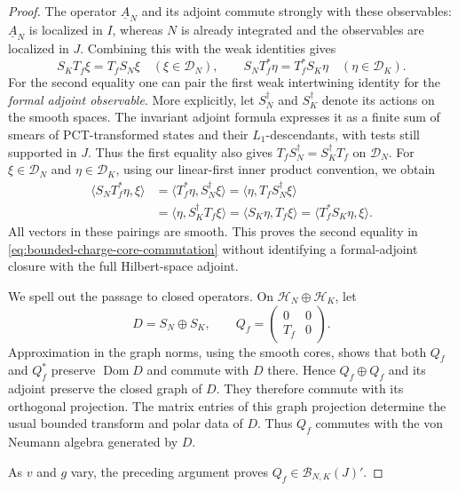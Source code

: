 \begin{proof}
The operator $\underline A_N$ and its adjoint commute strongly with these
observables: $\underline A_N$ is localized in $I$, whereas $N$ is already
integrated and the observables are localized in $J$.
Combining this with the weak identities gives
\begin{equation}
 S_KT_f\xi=T_fS_N\xi\quad(\xi\in\mathcal D_N),
 \qquad
 S_NT_f^*\eta=T_f^*S_K\eta\quad(\eta\in\mathcal D_K).
 \label{eq:bounded-charge-core-commutation}
\end{equation}
For the second equality one can pair the first weak intertwining
identity for the \emph{formal adjoint observable}.  More explicitly,
let $S_N^\dagger$ and $S_K^\dagger$ denote its actions on the smooth
spaces.  The invariant adjoint formula expresses it as a finite sum
of smears of PCT-transformed states and their $L_1$-descendants, with
tests still supported in $J$.  Thus the first equality also gives
$T_fS_N^\dagger=S_K^\dagger T_f$ on $\mathcal D_N$.
For $\xi\in\mathcal D_N$ and $\eta\in\mathcal D_K$, using our
linear-first inner product convention, we obtain
\[
\begin{aligned}
 \langle S_NT_f^*\eta,\xi\rangle
 &=\langle T_f^*\eta,S_N^\dagger\xi\rangle
  =\langle\eta,T_fS_N^\dagger\xi\rangle\\
 &=\langle\eta,S_K^\dagger T_f\xi\rangle
  =\langle S_K\eta,T_f\xi\rangle
  =\langle T_f^*S_K\eta,\xi\rangle.
\end{aligned}
\]
All vectors in these pairings are smooth.  This proves the second
equality in \eqref{eq:bounded-charge-core-commutation} without
identifying a formal-adjoint closure with the full Hilbert-space
adjoint.

We spell out the passage to closed operators.  On
$\mathcal H_N\oplus\mathcal H_K$, let
\[
 D=S_N\oplus S_K,\qquad
 Q_f=\begin{pmatrix}0&0\\T_f&0\end{pmatrix}.
\]
Approximation in the graph norms, using the smooth cores, shows that
both $Q_f$ and $Q_f^*$ preserve $\operatorname{Dom}D$ and commute with
$D$ there.  Hence $Q_f\oplus Q_f$ and its adjoint preserve the closed
graph of $D$.  They therefore commute with its orthogonal projection.
The matrix entries of this graph projection determine the usual
bounded transform and polar data of $D$.  Thus $Q_f$ commutes with the
von Neumann algebra generated by $D$.

As $v$ and $g$ vary, the preceding argument proves
$Q_f\in\mathcal B_{N,K}(J)'$.


\end{proof}
